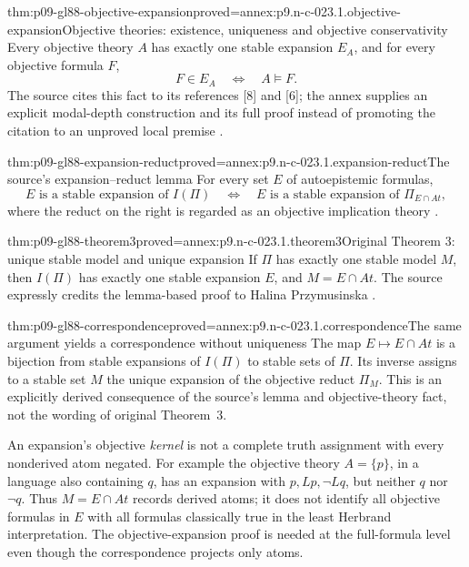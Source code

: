 \begin{hblemma}{thm:p09-gl88-objective-expansion}{proved=annex:p9.n-c-023.1.objective-expansion}{Objective theories: existence, uniqueness and objective conservativity}
Every objective theory \(A\) has exactly one stable expansion \(E_A\), and
for every objective formula \(F\),
\[
 F\in E_A\quad\Longleftrightarrow\quad A\models F.
\]
The source cites this fact to its references [8] and [6]; the annex supplies
an explicit modal-depth construction and its full proof instead of promoting
the citation to an unproved local premise
\cite[\S4, p.~8]{GelfondLifschitz1988}.
\end{hblemma}

\begin{hblemma}{thm:p09-gl88-expansion-reduct}{proved=annex:p9.n-c-023.1.expansion-reduct}{The source's expansion--reduct lemma}
For every set \(E\) of autoepistemic formulas,
\[
 E\text{ is a stable expansion of }I(\Pi)
 \quad\Longleftrightarrow\quad
 E\text{ is a stable expansion of }\Pi_{E\cap At},
\]
where the reduct on the right is regarded as an objective implication theory
\cite[\S4, lemma and proof, p.~9]{GelfondLifschitz1988}.
\end{hblemma}

\begin{hbtheorem}{thm:p09-gl88-theorem3}{proved=annex:p9.n-c-023.1.theorem3}{Original Theorem 3: unique stable model and unique expansion}
If \(\Pi\) has exactly one stable model \(M\), then \(I(\Pi)\) has
exactly one stable expansion \(E\), and \(M=E\cap At\).
The source expressly credits the lemma-based proof to Halina Przymusinska
\cite[\S4, Theorem~3 and proof, pp.~8--9]{GelfondLifschitz1988}.
\end{hbtheorem}

\begin{hbcorollary}{thm:p09-gl88-correspondence}{proved=annex:p9.n-c-023.1.correspondence}{The same argument yields a correspondence without uniqueness}
The map \(E\mapsto E\cap At\) is a bijection from stable expansions of
\(I(\Pi)\) to stable sets of \(\Pi\).  Its inverse assigns to a stable
set \(M\) the unique expansion of the objective reduct \(\Pi_M\).
This is an explicitly derived consequence of the source's lemma and
objective-theory fact, not the wording of original Theorem~3.
\end{hbcorollary}

An expansion's objective \emph{kernel} is not a complete truth assignment
with every nonderived atom negated.  For example the objective theory
\(A=\{p\}\), in a language also containing \(q\), has an expansion with
\(p,Lp,\neg Lq\), but neither \(q\) nor \(\neg q\).  Thus
\(M=E\cap At\) records derived atoms; it does not identify all objective
formulas in \(E\) with all formulas classically true in the least Herbrand
interpretation.  The objective-expansion proof is needed at the full-formula
level even though the correspondence projects only atoms.

